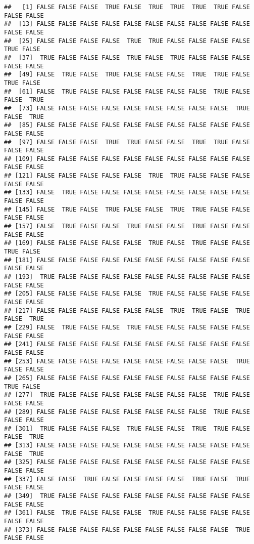 \documentclass[
]{book}
\begin{document}
\begin{verbatim}
##   [1] FALSE FALSE FALSE  TRUE FALSE  TRUE  TRUE  TRUE  TRUE FALSE FALSE FALSE
##  [13] FALSE FALSE FALSE FALSE FALSE FALSE FALSE FALSE FALSE FALSE FALSE FALSE
##  [25] FALSE FALSE FALSE FALSE  TRUE  TRUE FALSE FALSE FALSE FALSE  TRUE FALSE
##  [37]  TRUE FALSE FALSE FALSE  TRUE FALSE  TRUE FALSE FALSE FALSE FALSE FALSE
##  [49] FALSE  TRUE FALSE  TRUE FALSE FALSE FALSE  TRUE  TRUE FALSE  TRUE FALSE
##  [61] FALSE  TRUE FALSE FALSE FALSE FALSE FALSE FALSE  TRUE FALSE FALSE  TRUE
##  [73] FALSE FALSE FALSE FALSE FALSE FALSE FALSE FALSE FALSE  TRUE FALSE  TRUE
##  [85] FALSE FALSE FALSE FALSE FALSE FALSE FALSE FALSE FALSE FALSE FALSE FALSE
##  [97] FALSE FALSE FALSE  TRUE  TRUE FALSE FALSE  TRUE  TRUE FALSE FALSE FALSE
## [109] FALSE FALSE FALSE FALSE FALSE FALSE FALSE FALSE FALSE FALSE FALSE FALSE
## [121] FALSE FALSE FALSE FALSE FALSE  TRUE  TRUE FALSE FALSE FALSE FALSE FALSE
## [133] FALSE  TRUE FALSE FALSE FALSE FALSE FALSE FALSE FALSE FALSE FALSE FALSE
## [145] FALSE  TRUE FALSE  TRUE FALSE FALSE  TRUE  TRUE FALSE FALSE FALSE FALSE
## [157] FALSE  TRUE FALSE FALSE  TRUE FALSE FALSE  TRUE FALSE FALSE FALSE FALSE
## [169] FALSE FALSE FALSE FALSE FALSE  TRUE FALSE  TRUE FALSE FALSE  TRUE FALSE
## [181] FALSE FALSE FALSE FALSE FALSE FALSE FALSE FALSE FALSE FALSE FALSE FALSE
## [193]  TRUE FALSE FALSE FALSE FALSE FALSE FALSE FALSE FALSE FALSE FALSE FALSE
## [205] FALSE FALSE FALSE FALSE FALSE  TRUE FALSE FALSE FALSE FALSE FALSE FALSE
## [217] FALSE FALSE FALSE FALSE FALSE FALSE  TRUE  TRUE FALSE  TRUE FALSE  TRUE
## [229] FALSE  TRUE FALSE FALSE  TRUE FALSE FALSE FALSE FALSE FALSE FALSE FALSE
## [241] FALSE FALSE FALSE FALSE FALSE FALSE FALSE FALSE FALSE FALSE FALSE FALSE
## [253] FALSE FALSE FALSE FALSE FALSE FALSE FALSE FALSE FALSE  TRUE FALSE FALSE
## [265] FALSE FALSE FALSE FALSE FALSE FALSE FALSE FALSE FALSE FALSE  TRUE FALSE
## [277]  TRUE FALSE FALSE FALSE FALSE FALSE FALSE FALSE  TRUE FALSE FALSE FALSE
## [289] FALSE FALSE FALSE FALSE FALSE FALSE FALSE FALSE  TRUE FALSE FALSE FALSE
## [301]  TRUE FALSE FALSE FALSE  TRUE FALSE FALSE  TRUE  TRUE FALSE FALSE  TRUE
## [313] FALSE FALSE FALSE FALSE FALSE FALSE FALSE FALSE FALSE FALSE FALSE  TRUE
## [325] FALSE FALSE FALSE FALSE FALSE FALSE FALSE FALSE FALSE FALSE FALSE FALSE
## [337] FALSE FALSE  TRUE FALSE FALSE FALSE FALSE  TRUE FALSE  TRUE FALSE FALSE
## [349]  TRUE FALSE FALSE FALSE FALSE FALSE FALSE FALSE FALSE FALSE FALSE FALSE
## [361] FALSE  TRUE FALSE FALSE FALSE  TRUE FALSE FALSE FALSE FALSE FALSE FALSE
## [373] FALSE FALSE FALSE FALSE FALSE FALSE FALSE FALSE FALSE  TRUE FALSE FALSE

\end{verbatim}
\end{document}
